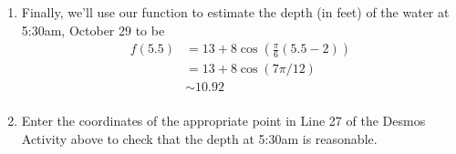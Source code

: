 \documentclass{ximera}
\begin{document}
\begin{example}
\begin{explanation}
\begin{enumerate}
\item Finally, we'll use our function to estimate the depth (in feet) of the water at 5:30am, October 29 to be
\begin{align*}
   f(5.5)   & = 13 + 8 \cos \left(  \frac{\pi}{6} \left(5.5 - 2 \right) \right) \\ 
           & = 13 + 8 \cos (7\pi / 12)  \\ 
           &  \sim  10.92 \\
         \end{align*}

\item Enter the coordinates of the appropriate point in Line 27 of the Desmos Activity above to check that the depth at 5:30am is reasonable.

\end{enumerate}

\end{explanation}

\end{example}
\end{document}
